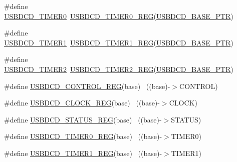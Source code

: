 \begin{DoxyCompactItemize}
\item 
\#define \hyperlink{group___u_s_b_d_c_d___register___accessor___macros_ga696142965d4e1a121400c0f9e42e9c30}{U\+S\+B\+D\+C\+D\+\_\+\+T\+I\+M\+E\+R0}~\hyperlink{group___u_s_b_d_c_d___register___accessor___macros_ga5eab5fbaf9280881c33dc0ed61dfbb80}{U\+S\+B\+D\+C\+D\+\_\+\+T\+I\+M\+E\+R0\+\_\+\+R\+EG}(\hyperlink{group___u_s_b_d_c_d___peripheral_ga6289dc687e9b991508629237aeb61755}{U\+S\+B\+D\+C\+D\+\_\+\+B\+A\+S\+E\+\_\+\+P\+TR})
\item 
\#define \hyperlink{group___u_s_b_d_c_d___register___accessor___macros_gacf474d5bde6a1007416398682f014768}{U\+S\+B\+D\+C\+D\+\_\+\+T\+I\+M\+E\+R1}~\hyperlink{group___u_s_b_d_c_d___register___accessor___macros_ga88e54db7c70cc1d168f792ffd054ceea}{U\+S\+B\+D\+C\+D\+\_\+\+T\+I\+M\+E\+R1\+\_\+\+R\+EG}(\hyperlink{group___u_s_b_d_c_d___peripheral_ga6289dc687e9b991508629237aeb61755}{U\+S\+B\+D\+C\+D\+\_\+\+B\+A\+S\+E\+\_\+\+P\+TR})
\item 
\#define \hyperlink{group___u_s_b_d_c_d___register___accessor___macros_gace4d8422fa65db55d5ebf6e94912d702}{U\+S\+B\+D\+C\+D\+\_\+\+T\+I\+M\+E\+R2}~\hyperlink{group___u_s_b_d_c_d___register___accessor___macros_ga0c14ac0966245ae63c84653a5c9ee453}{U\+S\+B\+D\+C\+D\+\_\+\+T\+I\+M\+E\+R2\+\_\+\+R\+EG}(\hyperlink{group___u_s_b_d_c_d___peripheral_ga6289dc687e9b991508629237aeb61755}{U\+S\+B\+D\+C\+D\+\_\+\+B\+A\+S\+E\+\_\+\+P\+TR})
\item 
\#define \hyperlink{group___u_s_b_d_c_d___register___accessor___macros_ga257d5151df6a12b6afd43a0ab18bd985}{U\+S\+B\+D\+C\+D\+\_\+\+C\+O\+N\+T\+R\+O\+L\+\_\+\+R\+EG}(base)                              ~((base)-\/$>$C\+O\+N\+T\+R\+OL)
\item 
\#define \hyperlink{group___u_s_b_d_c_d___register___accessor___macros_ga8bba9961332354ffeb00ecf680537695}{U\+S\+B\+D\+C\+D\+\_\+\+C\+L\+O\+C\+K\+\_\+\+R\+EG}(base)                                  ~((base)-\/$>$C\+L\+O\+CK)
\item 
\#define \hyperlink{group___u_s_b_d_c_d___register___accessor___macros_ga99a4ce6cc19f531916ab02aea07e14a9}{U\+S\+B\+D\+C\+D\+\_\+\+S\+T\+A\+T\+U\+S\+\_\+\+R\+EG}(base)                                ~((base)-\/$>$S\+T\+A\+T\+US)
\item 
\#define \hyperlink{group___u_s_b_d_c_d___register___accessor___macros_ga5eab5fbaf9280881c33dc0ed61dfbb80}{U\+S\+B\+D\+C\+D\+\_\+\+T\+I\+M\+E\+R0\+\_\+\+R\+EG}(base)                                ~((base)-\/$>$T\+I\+M\+E\+R0)
\item 
\#define \hyperlink{group___u_s_b_d_c_d___register___accessor___macros_ga88e54db7c70cc1d168f792ffd054ceea}{U\+S\+B\+D\+C\+D\+\_\+\+T\+I\+M\+E\+R1\+\_\+\+R\+EG}(base)                                ~((base)-\/$>$T\+I\+M\+E\+R1)

\end{DoxyCompactItemize}
